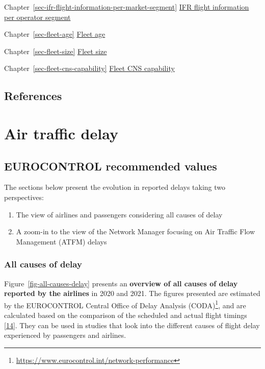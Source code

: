 \documentclass[
  11pt,
  a4paper,
]{book}
\DeclareRobustCommand{\href}[2]{#2\footnote{\url{#1}}}
\begin{document}
Chapter~\ref{sec-ifr-flight-information-per-market-segment}
\protect\hyperlink{sec-ifr-flight-information-per-market-segment}{IFR
flight information per operator segment}

Chapter~\ref{sec-fleet-age} \protect\hyperlink{sec-fleet-age}{Fleet age}

Chapter~\ref{sec-fleet-size} \protect\hyperlink{sec-fleet-size}{Fleet
size}

Chapter~\ref{sec-fleet-cns-capability}
\protect\hyperlink{sec-fleet-cns-capability}{Fleet CNS capability}

\hypertarget{references-3}{%
\section{References}\label{references-3}}

\hypertarget{sec-air-traffic-delay}{%
\chapter{Air traffic delay}\label{sec-air-traffic-delay}}

\hypertarget{eurocontrol-recommended-values-1}{%
\section{EUROCONTROL recommended
values}\label{eurocontrol-recommended-values-1}}

The sections below present the evolution in reported delays taking two
perspectives:

\begin{enumerate}
\def\labelenumi{\arabic{enumi}.}
\item
  The view of airlines and passengers considering all causes of delay
\item
  A zoom-in to the view of the Network Manager focusing on Air Traffic
  Flow Management (ATFM) delays
\end{enumerate}

\hypertarget{all-causes-of-delay}{%
\subsection{All causes of delay}\label{all-causes-of-delay}}

Figure~\ref{fig-all-causes-delay} presents an \textbf{overview of all
causes of delay reported by the airlines} in 2020 and 2021. The figures
presented are estimated by the EUROCONTROL
\href{https://www.eurocontrol.int/network-performance}{Central Office of
Delay Analysis (CODA)}, and are calculated based on the comparison of
the scheduled and actual flight timings
\protect\hyperlink{ref-coda2021}{{[}14{]}}. They can be used in studies
that look into the different causes of flight delay experienced by
passengers and airlines.
\end{document}
